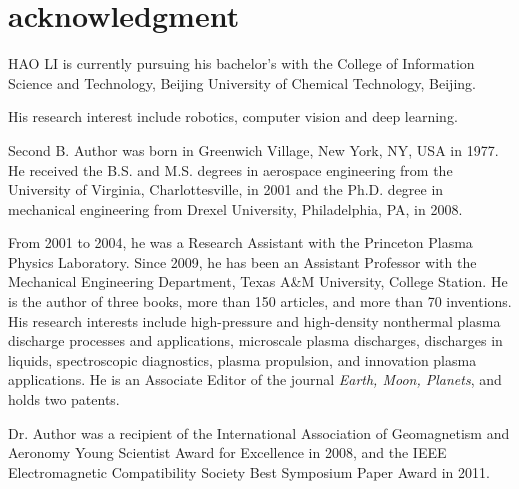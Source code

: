 \documentclass{ieeeaccess}
\begin{document}
  

\section{acknowledgment}




\begin{IEEEbiography}{HAO LI} 
  is currently pursuing his bachelor's with the College of Information Science and Technology, Beijing University of Chemical Technology, Beijing.

  His research interest include robotics, computer vision and deep learning.
\end{IEEEbiography}

\begin{IEEEbiography}{Second B. Author} was born in Greenwich Village, New York, NY, USA in 
1977. He received the B.S. and M.S. degrees in aerospace engineering from 
the University of Virginia, Charlottesville, in 2001 and the Ph.D. degree in 
mechanical engineering from Drexel University, Philadelphia, PA, in 2008.

From 2001 to 2004, he was a Research Assistant with the Princeton Plasma 
Physics Laboratory. Since 2009, he has been an Assistant Professor with the 
Mechanical Engineering Department, Texas A{\&}M University, College Station. 
He is the author of three books, more than 150 articles, and more than 70 
inventions. His research interests include high-pressure and high-density 
nonthermal plasma discharge processes and applications, microscale plasma 
discharges, discharges in liquids, spectroscopic diagnostics, plasma 
propulsion, and innovation plasma applications. He is an Associate Editor of 
the journal \emph{Earth, Moon, Planets}, and holds two patents. 

Dr. Author was a recipient of the International Association of Geomagnetism 
and Aeronomy Young Scientist Award for Excellence in 2008, and the IEEE 
Electromagnetic Compatibility Society Best Symposium Paper Award in 2011. 
\end{IEEEbiography}


\EOD
\end{document}

